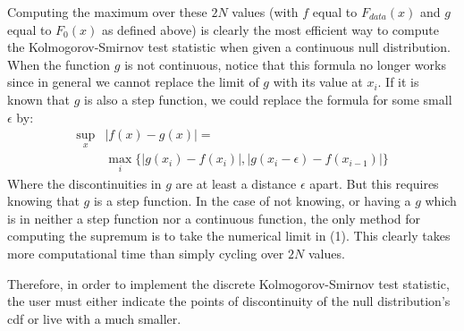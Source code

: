 Computing the maximum over these $2N$ values (with $f$ equal to $F_{data}(x)$ and $g$ equal to $F_0(x)$ as defined above) is clearly the 
most efficient way to compute the Kolmogorov-Smirnov test statistic when given a continuous null distribution. When the function $g$ is not
continuous, notice that this formula no longer works since in general we cannot replace the limit of $g$ with its value at $x_i$. If it is known that $g$
is also a step function, we could replace the formula for some small $\epsilon$ by:
\begin{align*}
\sup_x &\left| f(x)- g(x) \right| =   \\
        &                    \max_i \{ \left|g(x_i) - f(x_i) \right|, \left| g(x_i - \epsilon) - f(x_{i-1}) \right| \}
\end{align*}
Where the discontinuities in $g$ are at least a distance $\epsilon$ apart. But this requires knowing that $g$ is a step function. In the case of not knowing,
or having a $g$ which is in neither a step function nor a continuous function, the only method for computing the supremum is to take the numerical limit in (1). 
This clearly takes more computational time than simply cycling over $2N$ values.

Therefore, in order to implement the discrete Kolmogorov-Smirnov test statistic, the user must either indicate the points of discontinuity of the null
distribution's cdf or live with a much smaller.



